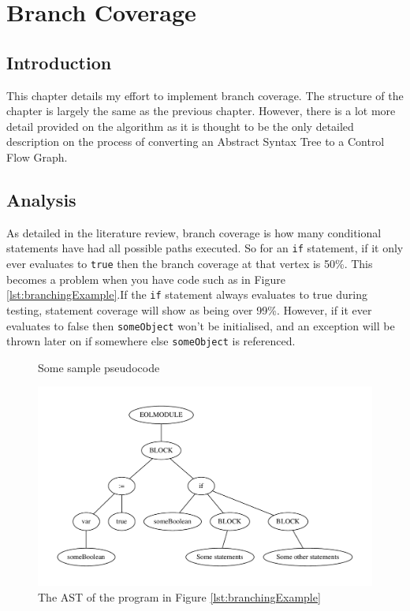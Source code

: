 \chapter{Branch Coverage}

\section{Introduction}
This chapter details my effort to implement branch coverage. The structure of the chapter is largely the same as the previous chapter. However, there is a lot more detail provided on the algorithm as it is thought to be the only detailed description on the process of converting an Abstract Syntax Tree to a Control Flow Graph.

\section{Analysis}

As detailed in the literature review, branch coverage is how many conditional statements have had all possible paths executed. So for an \verb|if| statement, if it only ever evaluates to \verb|true| then the branch coverage at that vertex is 50\%. This becomes a problem when you have code such as in Figure \ref{lst:branchingExample}.If the \verb|if| statement always evaluates to true during testing, statement coverage will show as being over 99\%. However, if it ever evaluates to false then \verb|someObject| won't be initialised, and an exception will be thrown later on if somewhere else \verb|someObject| is referenced.

\begin{figure}
\centering
\begin{minipage}{.33\textwidth}
  \centering
  
  \caption{Some sample pseudocode}
  \label{lst:branchingExample}
\end{minipage}%
\begin{minipage}{.5\textwidth}
  \centering
  \includegraphics[scale=0.5]{figures/branchSampleAST.pdf}
  \caption{The AST of the program in Figure \ref{lst:branchingExample}}
  \label{fig:branchExampleAST}
\end{minipage}
\end{figure}

